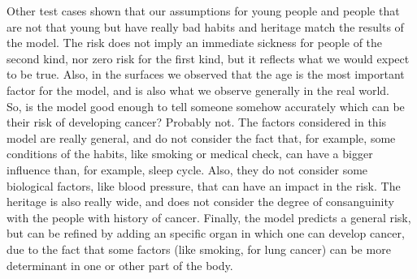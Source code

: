 \documentclass[conference]{IEEEtran}
\begin{document}
Other test cases shown that our assumptions for young people and people that are not that young but have really bad habits and heritage match the results of the model. The risk does not imply an immediate sickness for people of the second kind, nor zero risk for the first kind, but it reflects what we would expect to be true. Also, in the surfaces we observed that the age is the most important factor for the model, and is also what we observe generally in the real world. \\

So, is the model good enough to tell someone somehow accurately which can be their risk of developing cancer? Probably not. The factors considered in this model are really general, and do not consider the fact that, for example, some conditions of the habits, like smoking or medical check, can have a bigger influence than, for example, sleep cycle. Also, they do not consider some biological factors, like blood pressure, that can have an impact in the risk. The heritage is also really wide, and does not consider the degree of consanguinity with the people with history of cancer. Finally, the model predicts a general risk, but can be refined by adding an specific organ in which one can develop cancer, due to the fact that some factors (like smoking, for lung cancer) can be more determinant in one or other part of the body.

\nocite{*}


\end{document}

